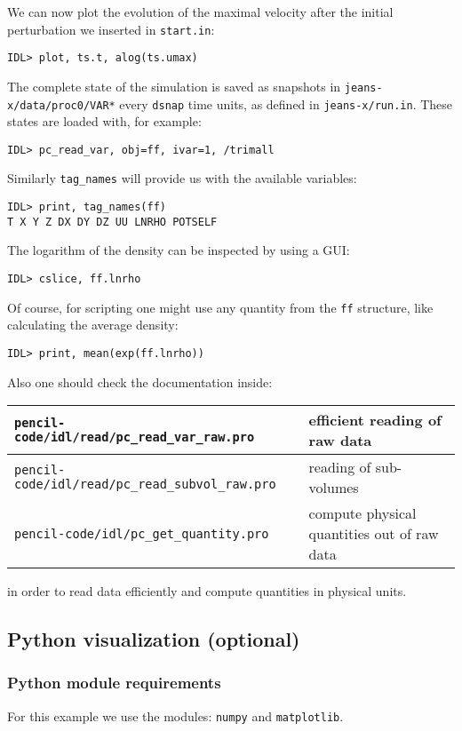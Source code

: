 \documentclass[a4paper,12pt]{article}
\begin{document}
We can now plot the evolution of the maximal velocity after the initial perturbation we inserted in \verb|start.in|:
\begin{verbatim}
IDL> plot, ts.t, alog(ts.umax)
\end{verbatim}

The complete state of the simulation is saved as snapshots in
\verb|jeans-x/data/proc0/VAR*| every \verb|dsnap| time units,
as defined in \verb|jeans-x/run.in|.
These states are loaded with, for example:
\begin{verbatim}
IDL> pc_read_var, obj=ff, ivar=1, /trimall
\end{verbatim}

Similarly \verb|tag_names| will provide us with the available variables:
\begin{verbatim}
IDL> print, tag_names(ff)
T X Y Z DX DY DZ UU LNRHO POTSELF
\end{verbatim}

The logarithm of the density can be inspected by using a GUI:
\begin{verbatim}
IDL> cslice, ff.lnrho
\end{verbatim}

Of course, for scripting one might use any quantity from the \verb|ff| structure, like calculating the average density:
\begin{verbatim}
IDL> print, mean(exp(ff.lnrho))
\end{verbatim}

Also one should check the documentation inside:
\begin{center}
\begin{tabular}{|l|l|}\hline
  \verb|pencil-code/idl/read/pc_read_var_raw.pro| & efficient reading of raw data\\\hline
  \verb|pencil-code/idl/read/pc_read_subvol_raw.pro| & reading of sub-volumes\\\hline
  \verb|pencil-code/idl/pc_get_quantity.pro| & compute physical quantities out of raw data\\\hline
\end{tabular}
\end{center}
in order to read data efficiently and compute quantities in physical units.


\subsection{Python visualization (optional)}
\subsubsection{Python module requirements}
For this example we use the modules: \verb|numpy| and \verb|matplotlib|.
\end{document}
